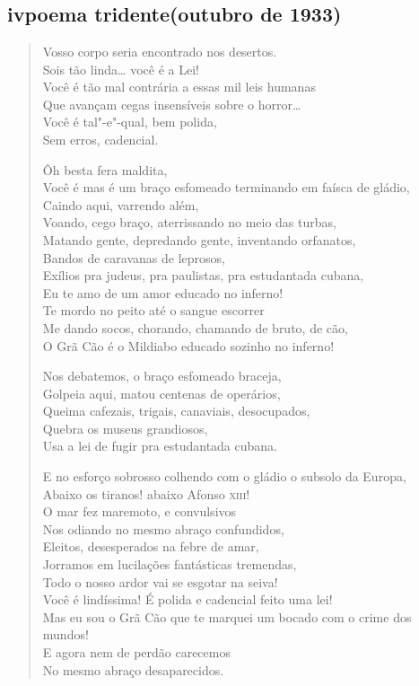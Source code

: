 \chapter*{}
\section*{iv\break poema tridente\break (outubro de 1933)}

\begin{verse}
Vosso corpo seria encontrado nos desertos.\\
Sois tão linda\ldots{} você é a Lei!\\
Você é tão mal contrária a essas mil leis humanas\\
Que avançam cegas insensíveis sobre o horror\ldots{}\\
Você é tal"-e"-qual, bem polida,\\
Sem erros, cadencial.

Ôh besta fera maldita,\\
Você é mas é um braço esfomeado terminando em faísca de gládio,\\
Caindo aqui, varrendo além,\\
Voando, cego braço, aterrissando no meio das turbas,\\
Matando gente, depredando gente, inventando orfanatos,\\
Bandos de caravanas de leprosos,\\
Exílios pra judeus, pra paulistas, pra estudantada cubana,\\
Eu te amo de um amor educado no inferno!\\
Te mordo no peito até o sangue escorrer\\
Me dando socos, chorando, chamando de bruto, de cão,\\
O Grã Cão é o Mildiabo educado sozinho no inferno!

Nos debatemos, o braço esfomeado braceja,\\
Golpeia aqui, matou centenas de operários,\\
Queima cafezais, trigais, canaviais, desocupados,\\
Quebra os museus grandiosos,\\
Usa a lei de fugir pra estudantada cubana.

E no esforço sobrosso colhendo com o gládio o subsolo da Europa,\\
Abaixo os tiranos! abaixo Afonso \textsc{xiii}!\\
O mar fez maremoto, e convulsivos\\
Nos odiando no mesmo abraço confundidos,\\
Eleitos, desesperados na febre de amar,\\
Jorramos em lucilações fantásticas tremendas,\\
Todo o nosso ardor vai se esgotar na seiva!\\
Você é lindíssima! É polida e cadencial feito uma lei!\\
Mas eu sou o Grã Cão que te marquei um bocado com o crime dos mundos!\\
E agora nem de perdão carecemos\\
No mesmo abraço desaparecidos.
\end{verse}

